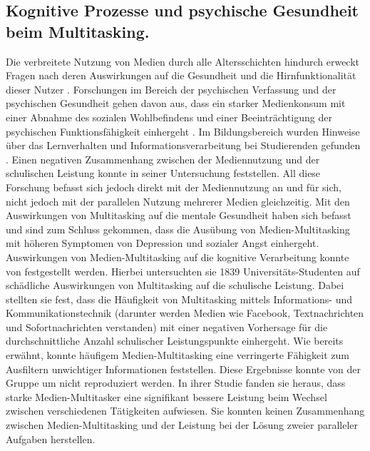 \subsection{Kognitive Prozesse und psychische Gesundheit beim Multitasking.} 
Die verbreitete Nutzung von Medien durch alle Altersschichten hindurch erweckt Fragen nach deren Auswirkungen auf die Gesundheit und die Hirnfunktionalität dieser Nutzer . Forschungen im Bereich der psychischen Verfassung und der psychischen Gesundheit gehen davon aus, dass ein starker Medienkonsum mit einer Abnahme des sozialen Wohlbefindens und einer Beeinträchtigung der psychischen Funktionsfähigkeit einhergeht \cite{Kraut1998, Moody2001}. Im Bildungsbereich wurden Hinweise über das Lernverhalten und Informationsverarbeitung bei Studierenden gefunden \cite{Prensky2001}. Einen negativen Zusammenhang zwischen der Mediennutzung und der schulischen Leistung konnte  in seiner Untersuchung feststellen. All diese Forschung befasst sich jedoch direkt mit der Mediennutzung an und für sich, nicht jedoch mit der parallelen Nutzung mehrerer Medien gleichzeitig. Mit den Auswirkungen von Multitasking auf die mentale Gesundheit haben sich  befasst und sind zum Schluss gekommen, dass die Ausübung von Medien-Multitasking mit höheren Symptomen von Depression und sozialer Angst einhergeht. Auswirkungen von Medien-Multitasking auf die kognitive Verarbeitung konnte von  festgestellt werden. Hierbei untersuchten sie 1839 Universitäts-Studenten auf schädliche Auswirkungen von Multitasking auf die schulische Leistung. Dabei stellten sie fest, dass die Häufigkeit von Multitasking mittels Informations- und Kommunikationstechnik (darunter werden Medien wie Facebook, Textnachrichten und Sofortnachrichten verstanden) mit einer negativen Vorhersage für die durchschnittliche Anzahl schulischer Leistungspunkte einhergeht. Wie bereits erwähnt, konnte  häufigem Medien-Multitasking eine verringerte Fähigkeit zum Ausfiltern unwichtiger Informationen feststellen. Diese Ergebnisse konnte von der Gruppe um  nicht reproduziert werden. In ihrer Studie fanden sie heraus, dass starke Medien-Multitasker eine signifikant bessere Leistung beim Wechsel zwischen verschiedenen Tätigkeiten aufwiesen. Sie konnten keinen Zusammenhang zwischen Medien-Multitasking und der Leistung bei der Lösung zweier paralleler Aufgaben herstellen. 

